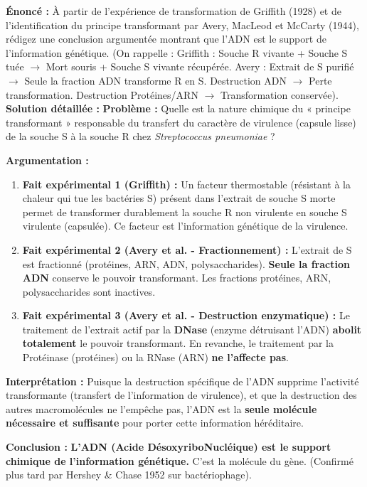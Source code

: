 \documentclass[11pt]{article}
\begin{document}
\begin{exoresolu}
\textbf{Énoncé :} À partir de l'expérience de transformation de Griffith (1928) et de l'identification du principe transformant par Avery, MacLeod et McCarty (1944), rédigez une conclusion argumentée montrant que l'ADN est le support de l'information génétique. (On rappelle : Griffith : Souche R vivante + Souche S tuée $\rightarrow$ Mort souris + Souche S vivante récupérée. Avery : Extrait de S purifié $\rightarrow$ Seule la fraction ADN transforme R en S. Destruction ADN $\rightarrow$ Perte transformation. Destruction Protéines/ARN $\rightarrow$ Transformation conservée).
\tcblower
\textbf{Solution détaillée :}
\textbf{Problème :} Quelle est la nature chimique du « principe transformant » responsable du transfert du caractère de virulence (capsule lisse) de la souche S à la souche R chez \textit{Streptococcus pneumoniae} ?

\textbf{Argumentation :}
\begin{enumerate}
    \item \textbf{Fait expérimental 1 (Griffith) :} Un facteur thermostable (résistant à la chaleur qui tue les bactéries S) présent dans l'extrait de souche S morte permet de transformer durablement la souche R non virulente en souche S virulente (capsulée). Ce facteur est l'information génétique de la virulence.
    \item \textbf{Fait expérimental 2 (Avery et al. - Fractionnement) :} L'extrait de S est fractionné (protéines, ARN, ADN, polysaccharides). \textbf{Seule la fraction ADN} conserve le pouvoir transformant. Les fractions protéines, ARN, polysaccharides sont inactives.
    \item \textbf{Fait expérimental 3 (Avery et al. - Destruction enzymatique) :} Le traitement de l'extrait actif par la \textbf{DNase} (enzyme détruisant l'ADN) \textbf{abolit totalement} le pouvoir transformant. En revanche, le traitement par la Protéinase (protéines) ou la RNase (ARN) \textbf{ne l'affecte pas}.
\end{enumerate}
\textbf{Interprétation :} Puisque la destruction spécifique de l'ADN supprime l'activité transformante (transfert de l'information de virulence), et que la destruction des autres macromolécules ne l'empêche pas, l'ADN est la \textbf{seule molécule nécessaire et suffisante} pour porter cette information héréditaire.

\textbf{Conclusion :} \textbf{L'ADN (Acide DésoxyriboNucléique) est le support chimique de l'information génétique.} C'est la molécule du gène. (Confirmé plus tard par Hershey \& Chase 1952 sur bactériophage).
\end{exoresolu}
\end{document}
